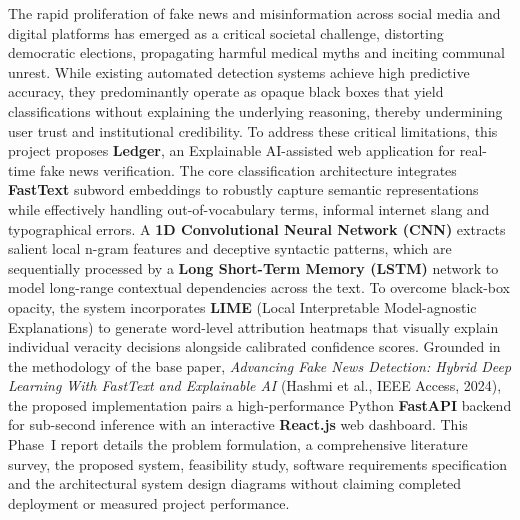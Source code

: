 \documentclass[12pt,a4paper,oneside]{report}
\begin{document}
The rapid proliferation of fake news and misinformation across social media and digital platforms has emerged as a critical societal challenge, distorting democratic elections, propagating harmful medical myths and inciting communal unrest. While existing automated detection systems achieve high predictive accuracy, they predominantly operate as opaque black boxes that yield classifications without explaining the underlying reasoning, thereby undermining user trust and institutional credibility. To address these critical limitations, this project proposes \textbf{Ledger}, an Explainable AI-assisted web application for real-time fake news verification. The core classification architecture integrates \textbf{FastText} subword embeddings to robustly capture semantic representations while effectively handling out-of-vocabulary terms, informal internet slang and typographical errors. A \textbf{1D Convolutional Neural Network (CNN)} extracts salient local n-gram features and deceptive syntactic patterns, which are sequentially processed by a \textbf{Long Short-Term Memory (LSTM)} network to model long-range contextual dependencies across the text. To overcome black-box opacity, the system incorporates \textbf{LIME} (Local Interpretable Model-agnostic Explanations) to generate word-level attribution heatmaps that visually explain individual veracity decisions alongside calibrated confidence scores. Grounded in the methodology of the base paper, \textit{Advancing Fake News Detection: Hybrid Deep Learning With FastText and Explainable AI} (Hashmi et al., IEEE Access, 2024), the proposed implementation pairs a high-performance Python \textbf{FastAPI} backend for sub-second inference with an interactive \textbf{React.js} web dashboard. This Phase~I report details the problem formulation, a comprehensive literature survey, the proposed system, feasibility study, software requirements specification and the architectural system design diagrams without claiming completed deployment or measured project performance.

\clearpage
\pagestyle{frontmatter}
\tableofcontents

\clearpage
\listoffigures

\clearpage
{}
\raggedbottom
{}
\setcounter{page}{1}
\end{document}
